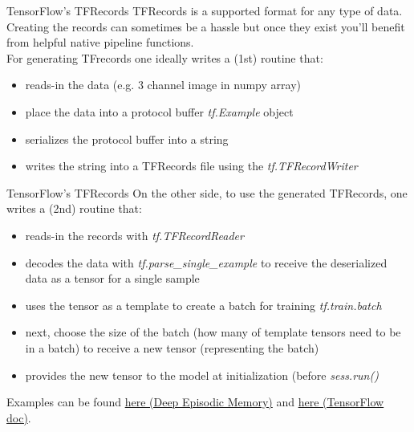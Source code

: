 \documentclass[18pt]{beamer}
\begin{document}
\begin{frame}{TensorFlow's TFRecords}
TFRecords is a supported format for any type of data. Creating the records can sometimes be a hassle but once they exist you'll benefit from helpful native pipeline functions. \\[12pt]For generating TFrecords one ideally writes a (1st) routine that:
\begin{itemize}
\item reads-in the data (e.g. 3 channel image in numpy array)
\item place the data into a protocol buffer \emph{tf.Example} object
\item serializes the protocol buffer into a string
\item writes the string into a TFRecords file using the \emph{tf.TFRecordWriter}
\end{itemize}
\end{frame}

\begin{frame}{TensorFlow's TFRecords}
On the other side, to use the generated TFRecords, one writes a (2nd) routine that:
\begin{itemize}
\item reads-in the records with \emph{tf.TFRecordReader} 
\item decodes the data with \emph{tf.parse\_single\_example} to receive the deserialized data as a tensor for a single sample
\item uses the tensor as a template to create a batch for training \emph{tf.train.batch}
\item next, choose the size of the batch (how many of template tensors need to be in a batch) to receive a new tensor (representing the batch) 
\item provides the new tensor to the model at initialization (before \emph{sess.run()}
\end{itemize}


Examples can be found \textcolor{kitgreen}{ \href{https://github.com/jonasrothfuss/DeepEpisodicMemory/blob/master/data_prep/convertToRecords.py\#L60}{here (Deep Episodic Memory)}} and \textcolor{kitgreen}{ \href{https://www.tensorflow.org/api_guides/python/reading_data\#file_formats}{here (TensorFlow doc)}}.

\end{frame}
\end{document}
